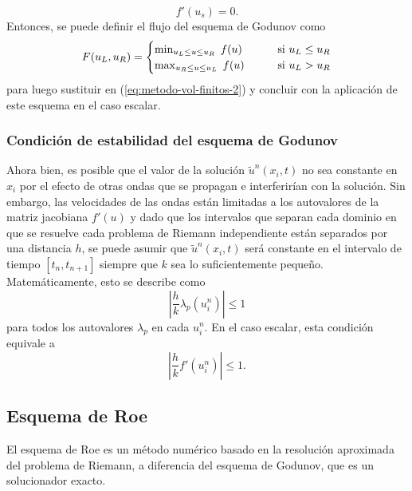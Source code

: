 \begin{equation}
	f'(u_s) = 0.
\end{equation}
Entonces, se puede definir el flujo del esquema de Godunov como
\begin{equation}
	F(u_L,u_R) = 
	\begin{cases}
		\min_{u_L \leq u \leq u_R} \hspace{1mm} f(u) & \hspace{7mm} \text{si }u_L \leq u_R \\
		\max_{u_R \leq u \leq u_L} \hspace{1mm} f(u) & \hspace{7mm} \text{si }u_L > u_R
	\end{cases}
\end{equation}
para luego sustituir en (\ref{eq:metodo-vol-finitos-2}) y concluir con la aplicación de este esquema en el caso escalar.
\subsubsection{Condición de estabilidad del esquema de Godunov}
Ahora bien, es posible que el valor de la solución $\tilde{u}^{n}(x_{i},t)$ no sea constante en $x_i$ por el efecto de otras ondas que se propagan e interferirían con la solución. Sin embargo, las velocidades de las ondas están limitadas a los autovalores de la matriz jacobiana $f'(u)$ y dado que los intervalos que separan cada dominio en que se resuelve cada problema de Riemann independiente están separados por una distancia $h$, se puede asumir que $\tilde{u}^{n}(x_{i},t)$ será constante en el intervalo de tiempo $[t_n, t_{n+1}]$ siempre que $k$ sea lo suficientemente pequeño. Matemáticamente, esto se describe como
\begin{equation}
	\left|\frac{h}{k} \lambda_{p}(u_i^{n})\right| \leq 1
\end{equation}
para todos los autovalores $\lambda_{p}$ en cada $u_i^{n}$. En el caso escalar, esta condición equivale a
\begin{equation}
	\left|\frac{h}{k} f'(u_i^{n})\right| \leq 1.
	\label{eq:cond-estabilidad}
\end{equation}

\subsection{Esquema de Roe}
El esquema de Roe es un método numérico basado en la resolución aproximada del problema de Riemann, a diferencia del esquema de Godunov, que es un solucionador exacto.

